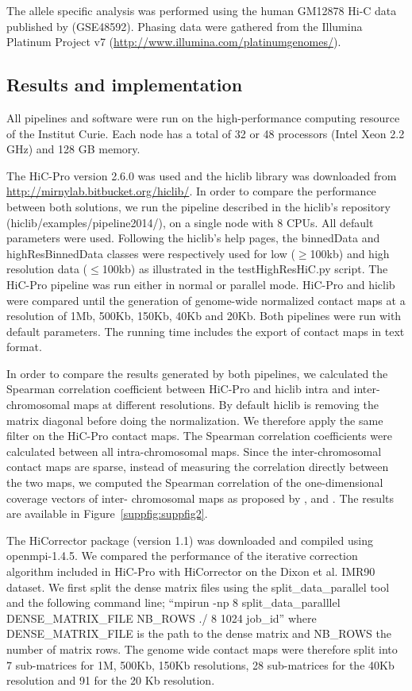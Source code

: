 The allele specific analysis was performed using the human GM12878 Hi-C data
published by \citet{selvaraj:whole-genome} (GSE48592). Phasing data were
gathered from the Illumina Platinum Project v7
(\href{http://www.illumina.com/platinumgenomes/}{http://www.illumina.com/platinumgenomes/}).

\subsection*{Results and implementation}

All pipelines and software were run on the high-performance computing resource
of the Institut Curie. Each node has a total of 32 or 48 processors (Intel
Xeon 2.2 GHz) and 128 GB memory.

The HiC-Pro version 2.6.0 was used and the hiclib library was downloaded from
\href{http://mirnylab.bitbucket.org/hiclib/}{http://mirnylab.bitbucket.org/hiclib/}.
In order to compare the performance between both solutions, we run the
pipeline described in the hiclib’s repository (hiclib/examples/pipeline2014/),
on a single node with 8 CPUs. All default parameters were used. Following the
hiclib's help pages, the binnedData and highResBinnedData classes were
respectively used for low ($\geq$100kb) and high resolution data ($\leq$100kb)
as illustrated in the testHighResHiC.py script. The HiC-Pro pipeline was run
either in normal or parallel mode. HiC-Pro and hiclib were compared until the
generation of genome-wide normalized contact maps at a resolution of 1Mb,
500Kb, 150Kb, 40Kb and 20Kb. Both pipelines were run with default parameters.
The running time includes the export of contact maps in text format.


In order to compare the results generated by both pipelines, we calculated the
Spearman correlation coefficient between HiC-Pro and hiclib intra and
inter-chromosomal maps at different resolutions. By default hiclib is removing
the matrix diagonal before doing the normalization. We therefore apply the
same filter on the HiC-Pro contact maps. The Spearman correlation coefficients
were calculated between all intra-chromosomal maps. Since the
inter-chromosomal contact maps are sparse, instead of measuring the
correlation directly between the two maps, we computed the Spearman
correlation of the one-dimensional coverage vectors of inter- chromosomal maps
as proposed by \citet{yaffe:probabilistic}, and \citet{hu:hicnorm}. The results are
available in Figure~\ref{suppfig:suppfig2}.

The HiCorrector package (version 1.1) was downloaded and compiled using
openmpi-1.4.5. We compared the performance of the iterative correction
algorithm included in HiC-Pro with HiCorrector on the Dixon et al. IMR90
dataset. We first split the dense matrix files using the split\_data\_parallel
tool and the following command line; “mpirun -np 8 split\_data\_paralllel
DENSE\_MATRIX\_FILE NB\_ROWS ./ 8 1024 job\_id” where DENSE\_MATRIX\_FILE is the
path to the dense matrix and NB\_ROWS the number of matrix rows. The genome
wide contact maps were therefore split into 7 sub-matrices for 1M, 500Kb,
150Kb resolutions, 28 sub-matrices for the 40Kb resolution and 91 for the 20
Kb resolution.


